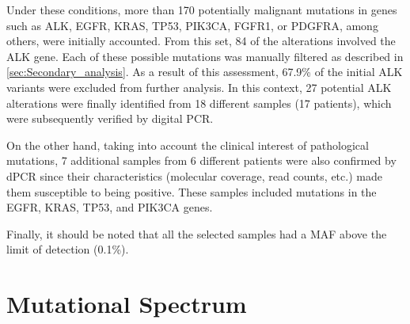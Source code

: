 Under these conditions, more than 170 potentially malignant mutations in genes such as ALK, EGFR, KRAS, TP53, PIK3CA, FGFR1, or PDGFRA, among others, were initially accounted. From this set, 84 of the alterations involved the ALK gene. Each of these possible mutations was manually filtered as described in \autoref{sec:Secondary_analysis}. As a result of this assessment, 67.9\% of the initial ALK variants were excluded from further analysis. In this context, 27 potential ALK alterations were finally identified from 18 different samples (17 patients), which were subsequently verified by digital PCR.

On the other hand, taking into account the clinical interest of pathological mutations, 7 additional samples from 6 different patients were also confirmed by dPCR since their characteristics (molecular coverage, read counts, etc.) made them susceptible to being positive. These samples included mutations in the EGFR, KRAS, TP53, and PIK3CA genes.

Finally, it should be noted that all the selected samples had a MAF above the limit of detection (0.1\%).

\section{Mutational Spectrum}




 



